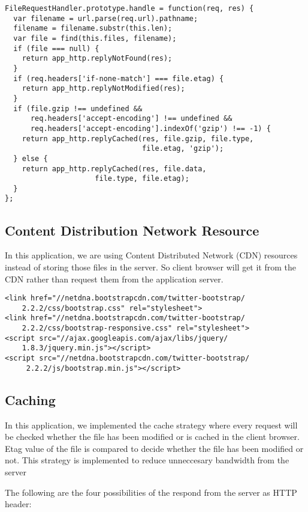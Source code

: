 \begin{lstlisting}
FileRequestHandler.prototype.handle = function(req, res) {
  var filename = url.parse(req.url).pathname;
  filename = filename.substr(this.len);
  var file = find(this.files, filename);
  if (file === null) {
    return app_http.replyNotFound(res);
  }
  if (req.headers['if-none-match'] === file.etag) {
    return app_http.replyNotModified(res);
  }
  if (file.gzip !== undefined && 
      req.headers['accept-encoding'] !== undefined && 
      req.headers['accept-encoding'].indexOf('gzip') !== -1) {
    return app_http.replyCached(res, file.gzip, file.type, 
                                file.etag, 'gzip');
  } else {
    return app_http.replyCached(res, file.data, 
                     file.type, file.etag);
  }
};
\end{lstlisting}

\subsection{Content Distribution Network Resource}
In this application, we are using Content Distributed Network (CDN) resources instead of storing those files in the server. So client browser will get it from the CDN rather than request them from the application server.  

\begin{lstlisting}
<link href="//netdna.bootstrapcdn.com/twitter-bootstrap/
    2.2.2/css/bootstrap.css" rel="stylesheet">
<link href="//netdna.bootstrapcdn.com/twitter-bootstrap/
    2.2.2/css/bootstrap-responsive.css" rel="stylesheet">
<script src="//ajax.googleapis.com/ajax/libs/jquery/
    1.8.3/jquery.min.js"></script>
<script src="//netdna.bootstrapcdn.com/twitter-bootstrap/
     2.2.2/js/bootstrap.min.js"></script>
\end{lstlisting}

\subsection{Caching}
In this application, we implemented the cache strategy where every request will be checked whether the file has been modified or is cached in the client browser. Etag value of the file is compared to decide whether the file has been modified or not. This strategy is implemented to reduce unneccesary bandwidth from the server

The following are the four possibilities of the respond from the server as HTTP header:

